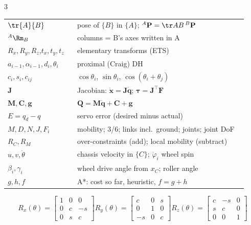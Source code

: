 \begin{multicols}{3}
\columnbreak
{}
\begin{tabular}{@{}p{0.27\linewidth}p{0.66\linewidth}@{}}
$\tr{A}{B}$ & pose of $\{B\}$ in $\{A\}$; $^A\mathbf P=\tr AB\,{}^B\mathbf P$\\
$^A\Rm_B$ & columns = B's axes written in A\\
$R_x,R_y,R_z$,\newline $t_x,t_y,t_z$ & elementary transforms (ETS)\\
$a_{i-1},\alpha_{i-1},d_i,\theta_i$ & proximal (Craig) DH\\
$c_i,s_i,c_{ij}$ & $\cos\theta_i$, $\sin\theta_i$, $\cos(\theta_i{+}\theta_j)$\\
$\mathbf J$ & Jacobian: $\dot{\mathbf x}=\mathbf J\dot{\mathbf q}$; $\boldsymbol\tau=\mathbf J^\top\mathbf F$\\
$\mathbf M,\mathbf C,\mathbf g$ & $\mathbf Q=\mathbf M\ddot{\mathbf q}+\mathbf C+\mathbf g$\\
$E=q_d-q$ & servo error (desired minus actual)\\
$M,D,N,J,F_i$ & mobility; 3/6; links incl.\ ground; joints; joint DoF\\
$R_C,R_M$ & over-constraints (add); local mobility (subtract)\\
$u,v,\dot\theta$ & chassis velocity in $\{C\}$; $\dot\varphi_i$ wheel spin\\
$\beta_i,\gamma_i$ & wheel drive angle from $x_C$; roller angle\\
$g,h,f$ & A*: cost so far, heuristic, $f=g+h$\\
\end{tabular}

{\small\[R_x(\theta)=\begin{bmatrix}1&0&0\\0&c&-s\\0&s&c\end{bmatrix}
R_y(\theta)=\begin{bmatrix}c&0&s\\0&1&0\\-s&0&c\end{bmatrix}
R_z(\theta)=\begin{bmatrix}c&-s&0\\s&c&0\\0&0&1\end{bmatrix}\]}


\end{multicols}
